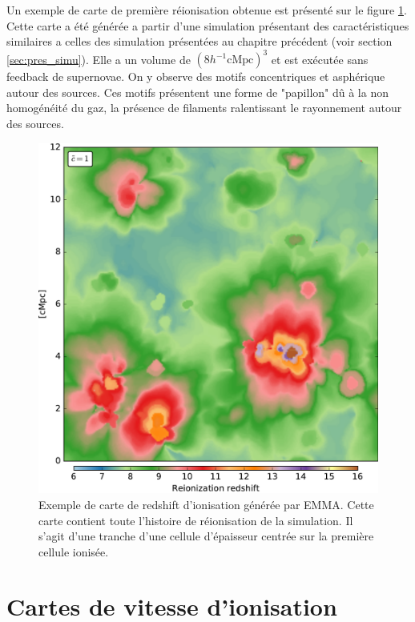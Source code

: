 Un exemple de carte de première réionisation obtenue est présenté sur le figure \ref{fig:zmap}.
Cette carte a été générée a partir d'une simulation présentant des caractéristiques similaires a celles des simulation présentées au chapitre précédent (voir section \ref{sec:pres_simu}).
Elle a un volume de $\left( 8h^{-1} \mathrm{cMpc} \right) ^3$ et est exécutée sans feedback de supernovae. 
On y observe des motifs concentriques et asphérique autour des sources. 
Ces motifs présentent une forme de "papillon" dû à la non homogénéité du gaz, la présence de filaments ralentissant le rayonnement autour des sources.

\begin{figure}
        \includegraphics[width=.95\linewidth]{img/04_mapreio/map_z_c1.pdf} 
        \caption[Carte de redshift d'ionisation]{Exemple de carte de redshift d'ionisation générée par EMMA.
        Cette carte contient toute l'histoire de réionisation de la simulation.
        Il s'agit d'une tranche d'une cellule d'épaisseur centrée sur la première cellule ionisée.
 		\label{fig:zmap}}
\end{figure}

\clearpage
\section{Cartes de vitesse d’ionisation}
\label{sec:vreio}


